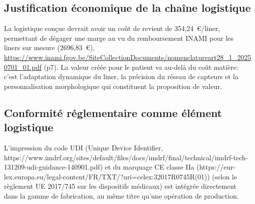 \subsection{Justification économique de la chaîne logistique}

La logistique conçue devrait avoir un coût de revient de 354,24~\euro{}/liner,
permettant de dégager une marge au vu du remboursement INAMI pour les liners sur mesure (2696,83~\euro{}), \url{https://www.inami.fgov.be/SiteCollectionDocuments/nomenclatureart28_1_20250701_01.pdf} (p7).
La valeur créée pour le patient va au-delà du coût matière: c'est l'adaptation
dynamique du liner, la précision du réseau de capteurs et la personnalisation morphologique qui
constituent la proposition de valeur.

\subsection{Conformité réglementaire comme élément logistique}

L'impression du code UDI (Unique Device Identifier, https://www.imdrf.org/sites/default/files/docs/imdrf/final/technical/imdrf-tech-131209-udi-guidance-140901.pdf) et du marquage CE classe IIa (https://eur-lex.europa.eu/legal-content/FR/TXT/?uri=celex:32017R0745R(01))
(selon le règlement UE 2017/745 sur les dispositifs médicaux) est intégrée directement dans la gamme
de fabrication, au même titre qu'une opération de production.




